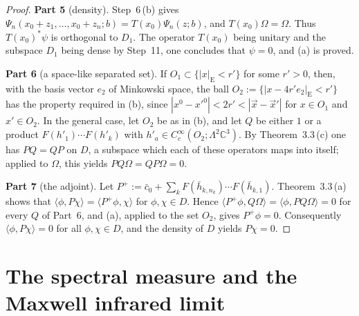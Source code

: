 \documentclass[11pt]{amsart}
\theoremstyle{definition}
\begin{document}
\begin{proof}
\textbf{Part 5} (density).
Step~6\,(b) gives $\Psi_n(x_0+z_1,\dots,x_0+z_n;b)=T(x_0)\Psi_n(z;b)$, and $T(x_0)\Omega=\Omega$.
Thus $T(x_0)^*\psi$ is orthogonal to $D_1$.
The operator $T(x_0)$ being unitary and the subspace $D_1$ being dense by Step~11, one concludes that $\psi=0$, and (a) is proved.

\textbf{Part 6} (a space-like separated set).
If $O_1\subset\{|x|_{\mathrm E}<r'\}$ for some $r'>0$, then, with the basis vector $e_2$ of Minkowski space, the ball $O_2:=\{|x-4r'e_2|_{\mathrm E}<r'\}$ has the property required in (b), since $|x^0-x'^0|<2r'<|\vec x-\vec x'|$ for $x\in O_1$ and $x'\in O_2$.
In the general case, let $O_2$ be as in (b), and let $Q$ be either $1$ or a product $F(h'_1)\cdots F(h'_k)$ with $h'_a\in C_c^\infty(O_2;\Lambda^2\mathbb C^3)$.
By Theorem~3.3\,(c) one has $PQ=QP$ on $D$, a subspace which each of these operators maps into itself; applied to $\Omega$, this yields $PQ\Omega=QP\Omega=0$.

\textbf{Part 7} (the adjoint).
Let $P^+:=\bar c_0+\sum_kF(\bar h_{k,n_k})\cdots F(\bar h_{k,1})$.
Theorem~3.3\,(a) shows that $\langle\phi,P\chi\rangle=\langle P^+\phi,\chi\rangle$ for $\phi,\chi\in D$.
Hence $\langle P^+\phi,Q\Omega\rangle=\langle\phi,PQ\Omega\rangle=0$ for every $Q$ of Part~6, and (a), applied to the set $O_2$, gives $P^+\phi=0$.
Consequently $\langle\phi,P\chi\rangle=0$ for all $\phi,\chi\in D$, and the density of $D$ yields $P\chi=0$.
\end{proof}


\section{The spectral measure and the Maxwell infrared limit}
\end{document}
